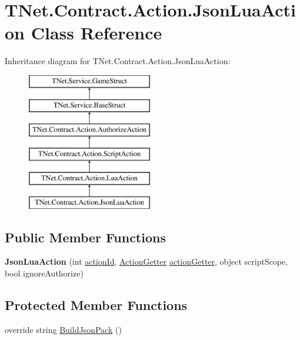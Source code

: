 \hypertarget{class_t_net_1_1_contract_1_1_action_1_1_json_lua_action}{}\section{T\+Net.\+Contract.\+Action.\+Json\+Lua\+Action Class Reference}
\label{class_t_net_1_1_contract_1_1_action_1_1_json_lua_action}
Inheritance diagram for T\+Net.\+Contract.\+Action.\+Json\+Lua\+Action\+:\begin{figure}[H]
\begin{center}
\leavevmode
\includegraphics[height=6.000000cm]{class_t_net_1_1_contract_1_1_action_1_1_json_lua_action}
\end{center}
\end{figure}
\subsection*{Public Member Functions}
\begin{DoxyCompactItemize}
\item 
\mbox{\label{class_t_net_1_1_contract_1_1_action_1_1_json_lua_action_a7ed72e59c026598554bb266db68389c6}} 
{\bfseries Json\+Lua\+Action} (int \mbox{\hyperlink{class_t_net_1_1_service_1_1_game_struct_a8c3c761a891a0da9d72d17d34a0f7446}{action\+Id}}, \mbox{\hyperlink{class_t_net_1_1_service_1_1_action_getter}{Action\+Getter}} \mbox{\hyperlink{class_t_net_1_1_service_1_1_game_struct_a14dcf224eb5a73e2c0b3bee4fe359dd8}{action\+Getter}}, object script\+Scope, bool ignore\+Authorize)
\end{DoxyCompactItemize}
\subsection*{Protected Member Functions}
\begin{DoxyCompactItemize}
\item 
override string \mbox{\hyperlink{class_t_net_1_1_contract_1_1_action_1_1_json_lua_action_a3b5e5d5a35643dfc2a610735729c8ee4}{Build\+Json\+Pack}} ()
\end{DoxyCompactItemize}
